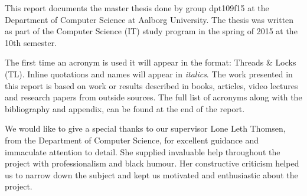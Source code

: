 \makeatletter {}\makeatother
{}
This report documents the master thesis done by group dpt109f15 at the Department of Computer Science at Aalborg University. The thesis was written as part of the Computer Science (IT) study program in the spring of 2015 at the 10th semester.

The first time an acronym is used it will appear in the format: Threads \& Locks (TL). Inline quotations and names will appear in \textit{italics}. The work presented in this report is based on work or results described in books, articles, video lectures and research papers from outside sources. The full list of acronyms along with the bibliography and appendix, can be found at the end of the report.

We would like to give a special thanks to our supervisor Lone Leth Thomsen, from the Department of Computer Science, for excellent guidance and immaculate attention to detail. She supplied invaluable help throughout the project with professionalism and black humour. Her constructive criticism helped us to narrow down the subject and kept us motivated and enthusiastic about the project.

